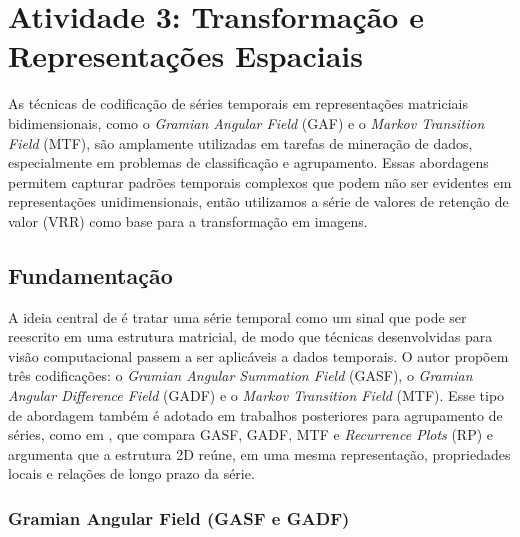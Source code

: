 \section{Atividade 3: Transformação e Representações Espaciais}

As técnicas de codificação de séries temporais em representações matriciais bidimensionais, como o \textit{Gramian Angular Field} (GAF) e o \textit{Markov Transition Field} (MTF), são amplamente utilizadas em tarefas de mineração de dados, especialmente em problemas de classificação e agrupamento. Essas abordagens permitem capturar padrões temporais complexos que podem não ser evidentes em representações unidimensionais, então utilizamos a série de valores de retenção de valor (VRR) como base para a transformação em imagens. 

\subsection{Fundamentação}

A ideia central de \cite{wang2015imaging} é tratar uma série temporal como um sinal que pode ser reescrito em uma estrutura matricial, de modo que técnicas desenvolvidas para visão computacional passem a ser aplicáveis a dados temporais. O autor propõem três codificações: o \textit{Gramian Angular Summation Field} (GASF), o \textit{Gramian Angular Difference Field} (GADF) e o \textit{Markov Transition Field} (MTF). Esse tipo de abordagem também é adotado em trabalhos posteriores para agrupamento de séries, como em \cite{wu2023imaging}, que compara GASF, GADF, MTF e \textit{Recurrence Plots} (RP) e argumenta que a estrutura 2D reúne, em uma mesma representação, propriedades locais e relações de longo prazo da série.

\subsubsection{Gramian Angular Field (GASF e GADF)}

